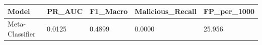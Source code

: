 \begin{tabular}{lllll}
\toprule
Model & PR\_AUC & F1\_Macro & Malicious\_Recall & FP\_per\_1000 \\
\midrule
Meta-Classifier & 0.0125 & 0.4899 & 0.0000 & 25.956 \\
\bottomrule
\end{tabular}
